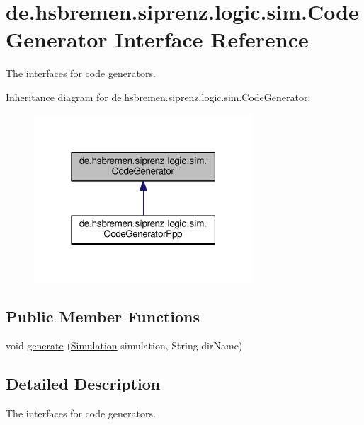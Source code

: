 \hypertarget{interfacede_1_1hsbremen_1_1siprenz_1_1logic_1_1sim_1_1CodeGenerator}{}\section{de.\+hsbremen.\+siprenz.\+logic.\+sim.\+Code\+Generator Interface Reference}
\label{interfacede_1_1hsbremen_1_1siprenz_1_1logic_1_1sim_1_1CodeGenerator}


The interfaces for code generators.  




Inheritance diagram for de.\+hsbremen.\+siprenz.\+logic.\+sim.\+Code\+Generator\+:\nopagebreak
\begin{figure}[H]
\begin{center}
\leavevmode
\includegraphics[width=232pt]{interfacede_1_1hsbremen_1_1siprenz_1_1logic_1_1sim_1_1CodeGenerator__inherit__graph}
\end{center}
\end{figure}
\subsection*{Public Member Functions}
\begin{DoxyCompactItemize}
\item 
void \hyperlink{interfacede_1_1hsbremen_1_1siprenz_1_1logic_1_1sim_1_1CodeGenerator_a2c30cae9f4f91ca44fa8c7f27aabbdc0}{generate} (\hyperlink{classde_1_1hsbremen_1_1siprenz_1_1model_1_1xml_1_1Simulation}{Simulation} simulation, String dir\+Name)
\end{DoxyCompactItemize}


\subsection{Detailed Description}
The interfaces for code generators. 

